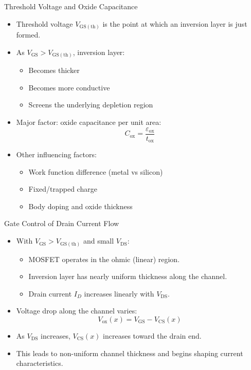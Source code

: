\begin{frame}{Threshold Voltage and Oxide Capacitance}
\begin{itemize}
    \item Threshold voltage $V_{\mathrm{GS(th)}}$ is the point at which an inversion layer is just formed.
    \item As $V_{\mathrm{GS}} > V_{\mathrm{GS(th)}}$, inversion layer:
    \begin{itemize}
        \item Becomes thicker
        \item Becomes more conductive
        \item Screens the underlying depletion region
    \end{itemize}
    \item Major factor: oxide capacitance per unit area:
    \[
        C_{\mathrm{ox}} = \frac{\varepsilon_{\mathrm{ox}}}{t_{\mathrm{ox}}}
    \]
    \item Other influencing factors:
    \begin{itemize}
        \item Work function difference (metal vs silicon)
        \item Fixed/trapped charge
        \item Body doping and oxide thickness
    \end{itemize}
\end{itemize}
\end{frame}

\begin{frame}{Gate Control of Drain Current Flow}
\begin{itemize}
    \item With $V_{\mathrm{GS}} > V_{\mathrm{GS(th)}}$ and small $V_{\mathrm{DS}}$:
    \begin{itemize}
        \item MOSFET operates in the ohmic (linear) region.
        \item Inversion layer has nearly uniform thickness along the channel.
        \item Drain current $I_D$ increases linearly with $V_{\mathrm{DS}}$.
    \end{itemize}
    \item Voltage drop along the channel varies:
    \[
        V_{\mathrm{ox}}(x) = V_{\mathrm{GS}} - V_{\mathrm{CS}}(x)
    \]
    \item As $V_{\mathrm{DS}}$ increases, $V_{\mathrm{CS}}(x)$ increases toward the drain end.
    \item This leads to non-uniform channel thickness and begins shaping current characteristics.
\end{itemize}
\end{frame}


